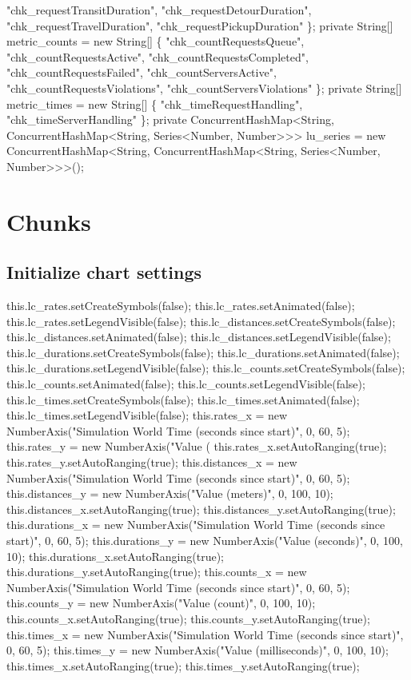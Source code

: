       "chk_requestTransitDuration",
      "chk_requestDetourDuration",
      "chk_requestTravelDuration",
      "chk_requestPickupDuration"
    \};
private String[] metric_counts = new String[] \{
      "chk_countRequestsQueue",
      "chk_countRequestsActive",
      "chk_countRequestsCompleted",
      "chk_countRequestsFailed",
      "chk_countServersActive",
      "chk_countRequestsViolations",
      "chk_countServersViolations"
    \};
private String[] metric_times = new String[] \{
      "chk_timeRequestHandling",
      "chk_timeServerHandling"
    \};
private ConcurrentHashMap<String, ConcurrentHashMap<String, Series<Number, Number>>> lu_series =
    new ConcurrentHashMap<String, ConcurrentHashMap<String, Series<Number, Number>>>();
\nwendcode{}\nwdocspar

\section{Chunks}
\subsection{Initialize chart settings}
\nwenddocs{}\endmoddef{}
this.lc_rates.setCreateSymbols(false);
this.lc_rates.setAnimated(false);
this.lc_rates.setLegendVisible(false);
this.lc_distances.setCreateSymbols(false);
this.lc_distances.setAnimated(false);
this.lc_distances.setLegendVisible(false);
this.lc_durations.setCreateSymbols(false);
this.lc_durations.setAnimated(false);
this.lc_durations.setLegendVisible(false);
this.lc_counts.setCreateSymbols(false);
this.lc_counts.setAnimated(false);
this.lc_counts.setLegendVisible(false);
this.lc_times.setCreateSymbols(false);
this.lc_times.setAnimated(false);
this.lc_times.setLegendVisible(false);
this.rates_x = new NumberAxis("Simulation World Time (seconds since start)", 0, 60, 5);
this.rates_y = new NumberAxis("Value (%
this.rates_x.setAutoRanging(true);
this.rates_y.setAutoRanging(true);
this.distances_x = new NumberAxis("Simulation World Time (seconds since start)", 0, 60, 5);
this.distances_y = new NumberAxis("Value (meters)", 0, 100, 10);
this.distances_x.setAutoRanging(true);
this.distances_y.setAutoRanging(true);
this.durations_x = new NumberAxis("Simulation World Time (seconds since start)", 0, 60, 5);
this.durations_y = new NumberAxis("Value (seconds)", 0, 100, 10);
this.durations_x.setAutoRanging(true);
this.durations_y.setAutoRanging(true);
this.counts_x = new NumberAxis("Simulation World Time (seconds since start)", 0, 60, 5);
this.counts_y = new NumberAxis("Value (count)", 0, 100, 10);
this.counts_x.setAutoRanging(true);
this.counts_y.setAutoRanging(true);
this.times_x = new NumberAxis("Simulation World Time (seconds since start)", 0, 60, 5);
this.times_y = new NumberAxis("Value (milliseconds)", 0, 100, 10);
this.times_x.setAutoRanging(true);
this.times_y.setAutoRanging(true);
\nwendcode{}\nwdocspar

